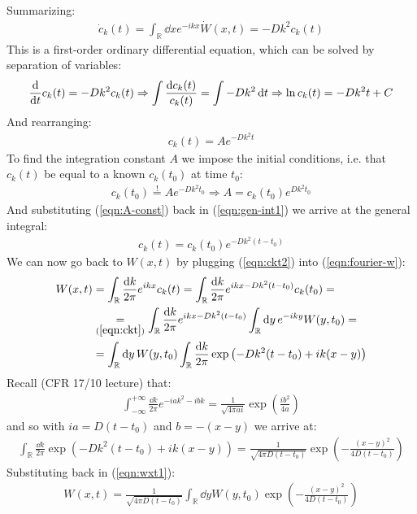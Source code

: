 \documentclass[../template.tex]{subfiles}
\begin{document}
Summarizing:
\begin{align*}
    \dot{c}_k(t) = \int_{\mathbb{R}} \dd{x} e^{-ikx} \dot{W}(x,t) = - D k^2 c_k(t)
\end{align*}
This is a first-order ordinary differential equation, which can be solved by separation of variables:
\begin{align*}
    \dv{t} c_k(t) = -Dk^2 c_k(t) \Rightarrow \int \frac{\dd{c_k(t)}}{c_k(t)} = \int -Dk^2 \dd{t}  \Rightarrow \ln c_k(t) = - Dk^2 t + C
\end{align*}
And rearranging:
\begin{align}
    c_k(t) = A e^{-Dk^2 t}
    \label{eqn:gen-int1}
\end{align}
To find the integration constant $A$ we impose the initial conditions, i.e. that $c_k(t)$ be equal to a known $c_k(t_0)$ at time $t_0$:
\begin{align}
    c_k(t_0) \overset{!}{=} A e^{-Dk^2 t_0} \Rightarrow A = c_k(t_0 ) e^{Dk^2 t_0} 
    \label{eqn:A-const}
\end{align}     
And substituting (\ref{eqn:A-const}) back in (\ref{eqn:gen-int1}) we arrive at the general integral:
\begin{align}
    c_k(t) = c_k(t_0 ) e^{-Dk^2(t-t_0)}
    \label{eqn:ckt2}
\end{align}
We can now go back to $W(x,t)$ by plugging (\ref{eqn:ckt2}) into (\ref{eqn:fourier-w}):
\begin{align} \nonumber
    W(x,t) &= \int_{\mathbb{R}} \frac{\dd{k}}{2 \pi} e^{ikx} c_k(t) = \int_{\mathbb{R}} \frac{\dd{k}}{2 \pi} e^{ikx - Dk^2(t-t_0 )} c_k(t_0) =\\ \nonumber
    &\underset{(\ref{eqn:ckt})}{=} \int_{\mathbb{R}} \frac{\dd{k}}{2 \pi} e^{ikx - Dk^2 (t-t_0 )} \int_{\mathbb{R}} \dd{y} e^{-iky} W(y,t_0) = \\
    &= \int_{\mathbb{R}} \dd{y} W(y,t_0 ) \int_{\mathbb{R}} \frac{\dd{k}}{2 \pi} \exp\left(-Dk^2(t-t_0 ) + ik(x-y)\right) 
    \label{eqn:wxt1}
\end{align}
Recall (CFR 17/10 lecture) that:
\begin{align*}
    \int_{-\infty}^{+\infty} \frac{\dd{k}}{2 \pi} e^{-iak^2 - ibk} = \frac{1}{\sqrt{4 \pi a i}} \exp\left(\frac{i b^2}{4 a} \right)  
\end{align*}
and so with $ia = D(t-t_0 )$ and $b=-(x-y)$ we arrive at:
\begin{align*}
    \int_{\mathbb{R}} \frac{\dd{k}}{2\pi} \exp(-Dk^2(t-t_0) + ik(x-y)) = \frac{1}{\sqrt{4 \pi D(t-t_0 ) }} \exp\left(-\frac{(x-y)^2}{4 D (t - t_0 )} \right) 
\end{align*} 
Substituting back in (\ref{eqn:wxt1}):
\begin{align}
    W(x,t) = \frac{1}{\sqrt{4 \pi D (t-t_0 ) }} \int_{\mathbb{R}} \dd{y} W(y,t_0 ) \exp\left(-\frac{(x-y)^2}{4 D (t-t_0 )} \right)
    \label{eqn:wxt2}
\end{align}
\end{document}
